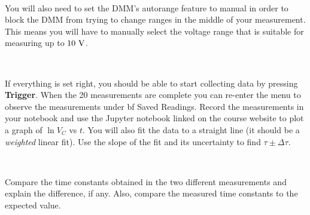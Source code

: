 \documentclass[12pt,oneside,openany,letterpaper]{article}
\begin{document}
~

\noindent You will also need to set the DMM's autorange feature to manual in order to block the DMM from trying to change ranges in the middle of your measurement. This means you will have to manually select the voltage range that is suitable for measuring up to $10\rm\ V$.

~

\noindent If everything is set right, you should be able to start collecting data by pressing {\bf Trigger}. When the 20 measurements are complete you can re-enter the menu to observe the measurements under {bf Saved Readings}. Record the measurements in your notebook and use the Jupyter notebook linked on the course website to plot a graph of $\ln V_C$ vs $t$.  You will also fit the data to a straight line (it should be a {\it weighted} linear fit).  Use the slope of the fit and its uncertainty to find $\tau\pm\Delta\tau$.  

~

\noindent Compare the time constants obtained in the two different measurements and explain the difference, if any.  Also, compare the measured time constants to the expected value.
\end{document}
